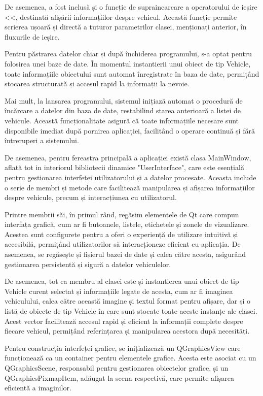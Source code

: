 \documentclass[a4paper,12pt]{report}
\begin{document}
De asemenea, a fost inclusă și o funcție de supraincarcare a operatorului de ieșire <<, destinată afișării informațiilor despre vehicul. Această funcție permite scrierea ușoară și directă a tuturor parametrilor clasei, menționați anterior, în fluxurile de ieșire.

Pentru păstrarea datelor chiar și după închiderea programului, s-a optat pentru folosirea unei baze de date. În momentul instantierii unui obiect de tip Vehicle, toate informațiile obiectului sunt automat înregistrate în baza de date, permițând stocarea structurată și accesul rapid la informații la nevoie.

Mai mult, la lansarea programului, sistemul inițiază automat o procedură de încărcare a datelor din baza de date, restabilind starea anterioară a listei de vehicule. Această funcționalitate asigură că toate informațiile necesare sunt disponibile imediat după pornirea aplicației, facilitând o operare continuă și fără întreruperi a sistemului.

De asemenea, pentru fereastra principală a aplicației există clasa MainWindow, aflată tot in interiorul bibliotecii dinamice "UserInterface", care este esențială pentru gestionarea interfeței utilizatorului și a datelor procesate. Aceasta include o serie de membri și metode care facilitează manipularea și afișarea informațiilor despre vehicule, precum și interacțiunea cu utilizatorul.

Printre membrii săi, în primul rând, regăsim elementele de Qt care compun interfața grafică, cum ar fi butoanele, listele, etichetele și zonele de vizualizare. Acestea sunt configurete pentru a oferi o experiență de utilizare intuitivă și accesibilă, permițând utilizatorilor să interacționeze eficient cu aplicația. De asemenea, se regăsește și fișierul bazei de date și calea către acesta, asigurând gestionarea persistentă și sigură a datelor vehiculelor.

De asemenea, tot ca membru al clasei este și instantierea unui obiect de tip Vehicle curent selectat și informațiile legate de acesta, cum ar fi imaginea vehiculului, calea către această imagine și textul format pentru afișare, dar și o listă de obiecte de tip Vehicle în care sunt stocate toate aceste instanțe ale clasei. Acest vector facilitează accesul rapid și eficient la informații complete despre fiecare vehicul, permițând referințarea și manipularea acestora după necesități.

Pentru construcția interfeței grafice, se inițializează un QGraphicsView care funcționează ca un container pentru elementele grafice. Acesta este asociat cu un QGraphicsScene, responsabil pentru gestionarea obiectelor grafice, și un QGraphicsPixmapItem, adăugat la scena respectivă, care permite afișarea eficientă a imaginilor.
\end{document}
